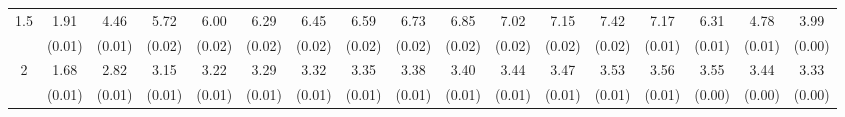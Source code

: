 \documentclass[12pt]{article}  %
\theoremstyle{plain}
\begin{document}
\begin{sidewaystable}[htbp]
\begin{tabular}{ccccccccccccccccc}
\multirow{2}{*}{1.5}  &1.91& 4.46 & 5.72 & 6.00 &  6.29 &  6.45  & 6.59  & 6.73  & 6.85  & 7.02 & 7.15 & 7.42 & 7.17&  6.31 & 4.78 & 3.99\\
                      &  (0.01)& (0.01)& (0.02)& (0.02)& (0.02)&(0.02)& (0.02)& (0.02)& (0.02)&  (0.02)&  (0.02)&  (0.02)&  (0.01)&  (0.01)&  (0.01)&     (0.00)\\ \hline                                                                                                                                                                                                                                                                                    
\multirow{2}{*}{2}  &1.68& 2.82 & 3.15 & 3.22  & 3.29  & 3.32  & 3.35  & 3.38  & 3.40  & 3.44 & 3.47 & 3.53 & 3.56 & 3.55 & 3.44 & 3.33\\
                      &  (0.01)& (0.01)& (0.01)& (0.01)& (0.01)& (0.01)& (0.01)& (0.01)& (0.01)&  (0.01)&  (0.01)&  (0.01)&  (0.01)&  (0.00)&  (0.00)   &(0.00)\\ \hline                                                                                                                                                                                                                                                                                    
\end{tabular}
\end{sidewaystable}
\end{document}
